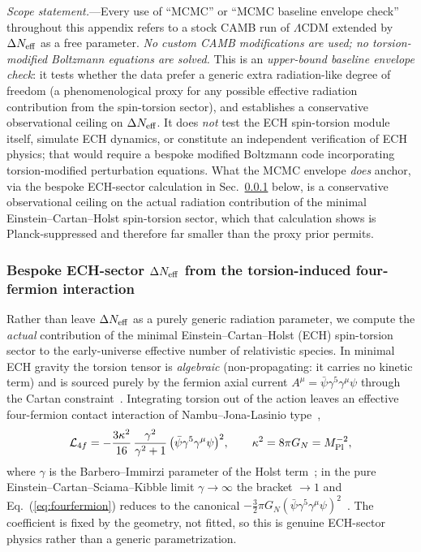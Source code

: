 \documentclass[aps,prd,twocolumn,superscriptaddress,showpacs,preprintnumbers,nofootinbib,longbibliography,floatfix]{revtex4-2}
\newcommand{\MPl}{M_{\rm Pl}}
\newcommand{\Neff}{N_{\rm eff}}
\begin{document}
\textit{Scope statement.}---Every use of ``MCMC'' or ``MCMC baseline envelope check'' throughout this
appendix refers to a stock CAMB run of $\Lambda$CDM extended by $\Delta\Neff$ as a free parameter.
\emph{No custom CAMB modifications are used; no torsion-modified Boltzmann
equations are solved.} This is an \emph{upper-bound baseline envelope check}:
it tests whether the data prefer a generic extra radiation-like degree of freedom
(a phenomenological proxy for any possible effective radiation contribution from the
spin-torsion sector), and establishes a conservative observational ceiling on
$\Delta\Neff$.  It does \emph{not} test the ECH spin-torsion module itself,
simulate ECH dynamics, or constitute an independent verification of ECH physics;
that would require a bespoke modified Boltzmann code incorporating torsion-modified
perturbation equations. What the MCMC envelope \emph{does} anchor,
via the bespoke ECH-sector calculation in Sec.~\ref{sec:p1b_torsion_neff} below,
is a conservative observational ceiling on the actual radiation contribution
of the minimal Einstein--Cartan--Holst spin-torsion sector, which that
calculation shows is Planck-suppressed and therefore far smaller than the
proxy prior permits.

\subsubsection{Bespoke ECH-sector $\Delta\Neff$ from the torsion-induced
four-fermion interaction}\label{sec:p1b_torsion_neff}

Rather than leave $\Delta\Neff$ as a purely generic radiation parameter, we
compute the \emph{actual} contribution of the minimal Einstein--Cartan--Holst
(ECH) spin-torsion sector to the early-universe effective number of
relativistic species. In minimal ECH gravity the torsion tensor is
\emph{algebraic} (non-propagating: it carries no kinetic term) and is sourced
purely by the fermion axial current $A^\mu=\bar\psi\gamma^5\gamma^\mu\psi$
through the Cartan constraint~\cite{Hehl1976}. Integrating torsion out of the
action leaves an effective four-fermion contact interaction of
Nambu--Jona-Lasinio type~\cite{Poplawski2011,Freidel2005},
\begin{equation}
\mathcal{L}_{4f}=-\frac{3\kappa^2}{16}\,\frac{\gamma^2}{\gamma^2+1}\,
\big(\bar\psi\gamma^5\gamma^\mu\psi\big)^2 ,
\qquad \kappa^2=8\pi G_N=\MPl^{-2} ,
\label{eq:fourfermion}
\end{equation}
where $\gamma$ is the Barbero--Immirzi parameter of the Holst
term~\cite{Freidel2005,Mercuri2006}; in the pure Einstein--Cartan--Sciama--Kibble
limit $\gamma\to\infty$ the bracket $\to 1$ and
Eq.~(\ref{eq:fourfermion}) reduces to the canonical
$-\tfrac{3}{2}\pi G_N (\bar\psi\gamma^5\gamma^\mu\psi)^2$~\cite{Poplawski2011}.
The coefficient is fixed by the geometry, not fitted, so this is genuine
ECH-sector physics rather than a generic parametrization.
\end{document}
